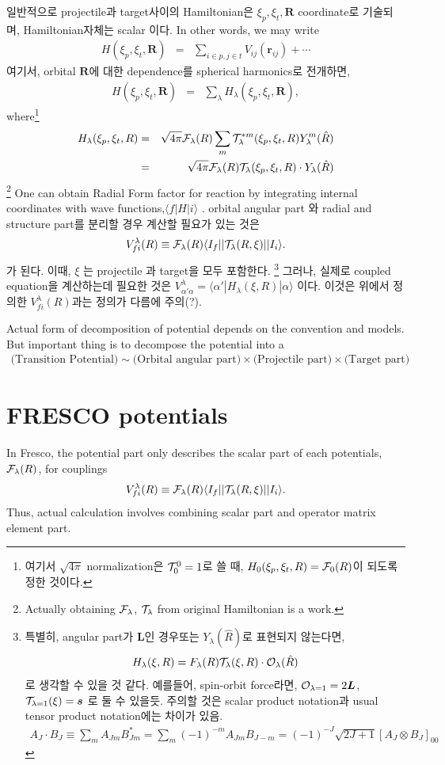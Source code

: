 \documentclass[11pt]{book}
\def\bm{\boldsymbol}
\def\vr{{\bm r}}
\def\vR{{\bm R}}
\def\la{\langle}
\def\ra{\rangle}
\newcommand{\bea}{\begin{eqnarray}}
\newcommand{\eea}{\end{eqnarray}}
\newcommand{\no}{\nonumber \\}
\begin{document}
일반적으로 projectile과 target사이의 Hamiltonian은 $\xi_p,\xi_t,\vR$ coordinate로 기술되며,
Hamiltonian자체는 scalar 이다. In other words, we may write
\bea 
H(\xi_p,\xi_t,\vR)&=&\sum_{i\in p,j\in t} V_{ij}(\vr_{ij})+\cdots 
\eea 
여기서, orbital $\vR$에 대한 dependence를 
spherical harmonics로 전개하면,
\bea 
H(\xi_p,\xi_t,\vR)&=&\sum_{\lambda} H_\lambda(\xi_p,\xi_t,\vR), 
\eea 
where\footnote{
여기서 $\sqrt{4\pi}$ normalization은 ${\cal T}_{0}^{0}=1$로 쓸 때,
$H_0(\xi_p,\xi_t,R)={\cal F}_0(R)$이 되도록 정한 것이다. 
} 
\bea 
H_\lambda(\xi_p,\xi_t,R)&=&\sqrt{4\pi}{\cal F}_\lambda(R) \sum_{m}
     {\cal T}_\lambda^{*m}(\xi_p,\xi_t,R)Y^m_\lambda(\hat{R})\no 
     &=& \sqrt{4\pi}{\cal F}_\lambda(R){\cal T}_\lambda(\xi_p,\xi_t,R)\cdot Y_\lambda(\hat{R})     
\eea 
\footnote{ Actually obtaining $\cal{F}_\lambda$, ${\cal T}_\lambda$ from original Hamiltonian 
is a work.} One can obtain Radial Form factor for reaction 
by integrating internal coordinates with wave functions,$\la f|H|i\ra$ . 
orbital angular part 와 
radial and structure part를 분리할 경우 계산할 필요가 있는 것은 
\bea 
V^\lambda_{fi}(R)\equiv {\cal F}_\lambda(R)\la I_f || {\cal T}_{\lambda}(R,\xi)|| I_i\ra.
\eea 
가 된다. 이때, $\xi$ 는 projectile 과 target을 모두 포함한다. 
\footnote{ 
특별히, angular part가 ${\bm L}$인 경우또는 $Y_\lambda(\hat{R})$로 표현되지 않는다면,
\bea 
H_\lambda(\xi,R)=F_\lambda(R) {\cal T}_\lambda(\xi,R)\cdot{\cal O}_\lambda(\hat{R}) 
\eea 
로 생각할 수 있을 것 같다. 예를들어, spin-orbit force라면, 
${\cal O}_{\lambda=1}=2{\bm L}$, ${\cal T}_{\lambda=1}(\xi)={\bm s}$ 로 둘 수 있을듯. 
주의할 것은 scalar product notation과 usual tensor product notation에는 차이가 있음.
\bea 
A_J\cdot B_J\equiv \sum_{m} A_{Jm}B^*_{Jm}=\sum_{m} (-1)^{-m} A_{Jm}B_{J-m}
    = (-1)^{-J}\sqrt{2J+1}\left[ A_J\otimes B_J\right]_{00}
\eea 
}
그러나, 실제로 coupled equation을 계산하는데 필요한 것은 
$V_{\alpha'\alpha}^\lambda=\la \alpha'|H_\lambda(\xi,R)|\alpha\ra$ 이다. 이것은 위에서 정의한 
$V^\lambda_{fi}(R)$과는 정의가 다름에 주의(?). 

Actual form of decomposition of potential depends on the convention and models.
But important thing is to decompose the potential into a 
\bea 
\mbox{(Transition Potential)}\sim 
\mbox{(Orbital angular part)}\times\mbox{(Projectile part)}\times\mbox{(Target part)}
\eea 


\section{FRESCO potentials}
In Fresco, the potential part only describes the scalar part of each potentials, ${\cal F}_\lambda(R)$, for couplings
\bea 
V^\lambda_{fi}(R)\equiv {\cal F}_\lambda(R)\la I_f || {\cal T}_{\lambda}(R,\xi)|| I_i\ra.
\eea 
Thus, actual calculation involves combining scalar part and operator matrix element part. 
\end{document}
